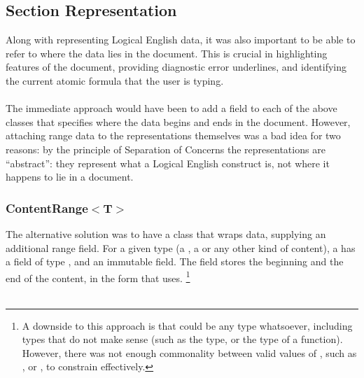 \documentclass[../main.tex]{subfiles}
\begin{document}
\subsection{Section Representation}
Along with representing Logical English data, it was also important to be able to refer to where the data lies in the document. This is crucial in highlighting features of the document, providing diagnostic error underlines, and identifying the current atomic formula that the user is typing. 
\\
\\
The immediate approach would have been to add a  field to each of the above classes that specifies where the data begins and ends in the document. However, attaching range data to the representations themselves was a bad idea for two reasons: by the principle of Separation of Concerns \cite[p.~183]{software_handbook_soc} the representations are ``abstract'': they represent what a Logical English construct is, not where it happens to lie in a document. 

\subsubsection{ContentRange$<$T$>$}
The alternative solution was to have a class that wraps data, supplying an additional range field. For a given type  (a , a  or any other kind of content), a  has a  field of type , and an immutable  field. 
The  field stores the beginning and the end of the content, in the  form that  uses. \footnote{A downside to this approach is that  could be any type whatsoever, including types that do not make sense (such as the  type, or the type of a function). However, there was not enough commonality between valid values of , such as ,  or , to constrain  effectively.} 
\\
\\
\end{document}
